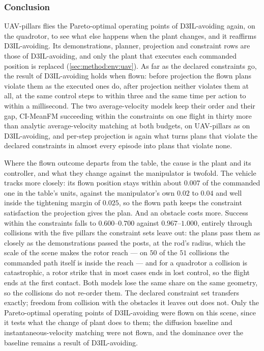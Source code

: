 \FloatBarrier
\subsubsection{Conclusion}\label{sec:res:uav:pillars:conclusion}

UAV-pillars flies the Pareto-optimal operating points of D3IL-avoiding again, on the quadrotor, to see what
else happens when the plant changes, and it reaffirms D3IL-avoiding. Its demonstrations, planner, projection
and constraint rows are those of D3IL-avoiding, and only the plant that executes each commanded position is
replaced (\autoref{sec:method:env:uav}). As far as the declared constraints go, the result of D3IL-avoiding holds when
flown: before projection the flown plans violate them as the executed ones do, after projection neither
violates them at all, at the same control steps to within three and the same time per action to within a
millisecond. The two average-velocity models keep their order and their gap, CI-MeanFM succeeding within the
constraints on one flight in thirty more than analytic average-velocity matching at both budgets, on
UAV-pillars as on D3IL-avoiding, and per-step projection is again what turns plans that violate the declared
constraints in almost every episode into plans that violate none.

Where the flown outcome departs from the table, the cause is the plant and its controller, and what they
change against the manipulator is twofold. The vehicle tracks more
closely: its flown position stays within about $0.007$ of the commanded one in the table's units, against the
manipulator's own $0.02$ to $0.04$ and well inside the tightening margin of $0.025$, so the flown path keeps
the constraint satisfaction the projection gives the plan. And an obstacle costs more. Success within the
constraints falls to $0.600$--$0.700$ against $0.967$--$1.000$, entirely through collisions with the five
pillars the constraint sets leave out: the plans pass them as closely as the demonstrations passed the posts,
at the rod's radius, which the scale of the scene makes the rotor reach --- on $50$ of the $51$ collisions the
commanded path itself is inside the reach --- and for a quadrotor a collision is catastrophic, a rotor strike
that in most cases ends in lost control, so the flight ends at the first contact. Both models lose the same
share on the same geometry, so the collisions do not re-order them. The declared constraint set transfers
exactly; freedom from collision with the obstacles it leaves out does not.
Only the Pareto-optimal operating points of D3IL-avoiding were flown on this scene, since it tests what
the change of plant does to them; the diffusion baseline and instantaneous-velocity matching were not flown,
and the dominance over the baseline remains a result of D3IL-avoiding.

